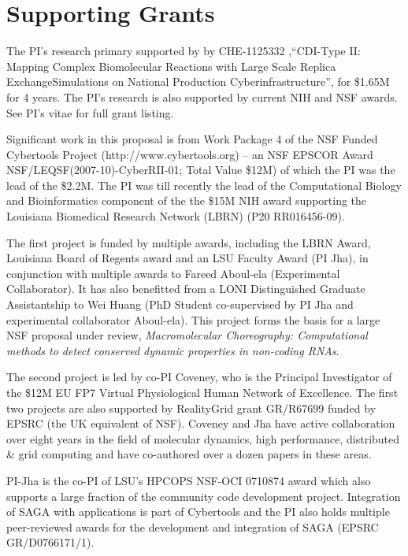 \documentclass[a4paper,10pt]{article}
\begin{document}
\section{Supporting Grants}

The PI's research primary supported by by CHE-1125332 ,``CDI-Type II: Mapping Complex Biomolecular Reactions with Large Scale Replica ExchangeSimulations on National Production Cyberinfrastructure'', for \$1.65M for 4 years. The PI's research is also supported by current NIH and NSF awards.  See PI's vitae for full grant listing.

Significant work in this proposal is from Work Package 4 of the NSF Funded Cybertools Project (http://www.cybertools.org) -- an NSF EPSCOR Award NSF/LEQSF(2007-10)-CyberRII-01; Total Value \$12M) of which the PI was the lead of the \$2.2M. The PI was till recently the lead of the Computational Biology and Bioinformatics component of the the \$15M NIH award supporting the Louisiana Biomedical Research Network (LBRN) (P20 RR016456-09). %

The first project is funded by multiple awards, including the LBRN Award, Louisiana Board of Regents award and an LSU Faculty Award (PI Jha), in conjunction with multiple awards to Fareed Aboul-ela (Experimental Collaborator). It has also benefitted from a LONI Distinguished Graduate Assistantship to Wei Huang (PhD Student co-supervised by PI Jha and experimental collaborator Aboul-ela). This project forms the basis for a large NSF proposal under review, {\it Macromolecular Choreography: Computational methods to detect conserved dynamic properties in non-coding RNAs}.

The second project is led by co-PI Coveney, who is the Principal Investigator of the \$12M EU FP7 Virtual Physiological Human Network of Excellence. The first two projects are also supported by RealityGrid grant GR/R67699 funded by EPSRC (the UK equivalent of NSF). Coveney and Jha have active collaboration over eight years in the field of molecular dynamics, high performance, distributed \& grid computing and have co-authored over a dozen papers in these areas.
 
PI-Jha is the co-PI of LSU's HPCOPS NSF-OCI 0710874 award which also supports a large fraction of the community code development project. Integration of SAGA with applications is part of Cybertools and the PI also holds multiple peer-reviewed awards for the development and integration of SAGA (EPSRC GR/D0766171/1). %
\end{document}
